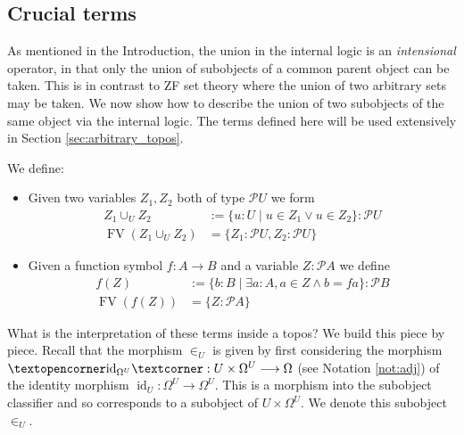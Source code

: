 \documentclass{tac}
\newcommand{\call}[1]{\mathcal{#1}}
\newcommand{\adj}[1]{\text{\textopencorner}{#1}\text{\textcorner}}
\newcommand{\lto}{\longrightarrow}
\begin{document}
	\subsection{Crucial terms}\label{sec:crucial_terms}
	As mentioned in the Introduction, the union in the internal logic is an \emph{intensional} operator, in that only the union of subobjects of a common parent object can be taken. This is in contrast to ZF set theory where the union of two arbitrary sets may be taken. We now show how to describe the union of two subobjects of the same object via the internal logic. The terms defined here will be used extensively in Section \ref{sec:arbitrary_topos}.
	\begin{definition}\label{def:crucial_terms}
		We define:
		\begin{itemize}
			\item Given two variables $Z_1,Z_2$ both of type $\call{P}U$ we form
			\begin{align}
					Z_1 \cup_U Z_2 &:= \lbrace u:U \mid u \in Z_1 \vee u \in Z_2\rbrace : \call{P}U\\
					\operatorname{FV}(Z_1 \cup_U Z_2) &= \lbrace Z_1 : \call{P}U, Z_2 : \call{P}U\rbrace 
			\end{align}
			\item Given a function symbol $f: A \lto B$ and a variable $Z : \call{P}A$ we define
			\begin{align}
					f(Z) &:= \lbrace b : B \mid \exists a : A, a \in Z \wedge b = fa\rbrace: \call{P}B\\
					 \operatorname{FV}(f(Z)) &= \lbrace Z: \call{P}A\rbrace
			\end{align}
		\end{itemize}
	\end{definition}
	What is the interpretation of these terms inside a topos? We build this piece by piece. Recall that the morphism $\in_U$ is given by first considering the morphism $\adj{\operatorname{id}_{\Omega^U}}: U \times \Omega^U \lto \Omega$ (see Notation \ref{not:adj}) of the identity morphism $\operatorname{id}_U: \Omega^U \lto \Omega^U$. This is a morphism into the subobject classifier and so corresponds to a subobject of $U \times \Omega^U$. We denote this subobject $\in_U$.
\end{document}
